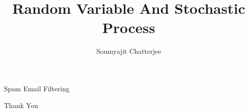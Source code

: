 \documentclass{beamer}
\title{Random Variable And Stochastic Process}
\author[]{Soumyajit Chatterjee}
\institute[AI22MTECH02005]
{
\inst{}
AI22MTECH02005
\and
\inst{}
Indian Institute of Technology, Hyderabad
}
\begin{document}
\frame{\titlepage{}}

\begin{frame}{}
\LARGE \centering \color{blue} Spam Email Filtering
\end{frame}



\begin{frame}{}
\LARGE \centering \color{blue} Thank You
\end{frame}
\end{document}
